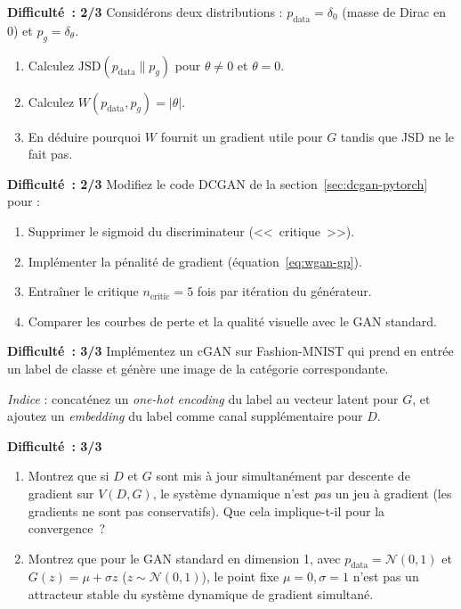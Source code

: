 \begin{exercice}
\label{exo:wgan-compare}
\textbf{Difficult\'e~: 2/3}
Consid\'erons deux distributions : $p_{\text{data}} = \delta_0$ (masse de Dirac en 0) et $p_g = \delta_\theta$.
\begin{enumerate}
    \item Calculez $\text{JSD}(p_{\text{data}} \| p_g)$ pour $\theta \neq 0$ et $\theta = 0$.
    \item Calculez $W(p_{\text{data}}, p_g) = |\theta|$.
    \item En d\'eduire pourquoi $W$ fournit un gradient utile pour $G$ tandis que JSD ne le fait pas.
\end{enumerate}
\end{exercice}

\begin{exercice}
\label{exo:wgan-gp-impl}
\textbf{Difficult\'e~: 2/3}
Modifiez le code DCGAN de la section~\ref{sec:dcgan-pytorch} pour :
\begin{enumerate}
    \item Supprimer le sigmoid du discriminateur (<<~critique~>>).
    \item Impl\'ementer la p\'enalit\'e de gradient (\'equation~\eqref{eq:wgan-gp}).
    \item Entra\^iner le critique $n_{\text{critic}}=5$ fois par it\'eration du g\'en\'erateur.
    \item Comparer les courbes de perte et la qualit\'e visuelle avec le GAN standard.
\end{enumerate}
\end{exercice}

\begin{exercice}
\label{exo:cgan-impl}
\textbf{Difficult\'e~: 3/3}
Impl\'ementez un cGAN sur Fashion-MNIST qui prend en entr\'ee un label de classe et g\'en\`ere une image de la cat\'egorie correspondante.

\emph{Indice} : concat\'enez un \emph{one-hot encoding} du label au vecteur latent pour $G$, et ajoutez un \emph{embedding} du label comme canal suppl\'ementaire pour $D$.
\end{exercice}

\begin{exercice}
\label{exo:gan-convergence}
\textbf{Difficult\'e~: 3/3}
\begin{enumerate}
    \item Montrez que si $D$ et $G$ sont mis \`a jour simultan\'ement par descente de gradient sur $V(D, G)$, le syst\`eme dynamique n'est \emph{pas} un jeu \`a gradient (les gradients ne sont pas conservatifs). Que cela implique-t-il pour la convergence~?
    \item Montrez que pour le GAN standard en dimension 1, avec $p_{\text{data}} = \mathcal{N}(0, 1)$ et $G(z) = \mu + \sigma z$ ($z \sim \mathcal{N}(0,1)$), le point fixe $\mu=0, \sigma=1$ n'est pas un attracteur stable du syst\`eme dynamique de gradient simultan\'e.
\end{enumerate}
\end{exercice}

